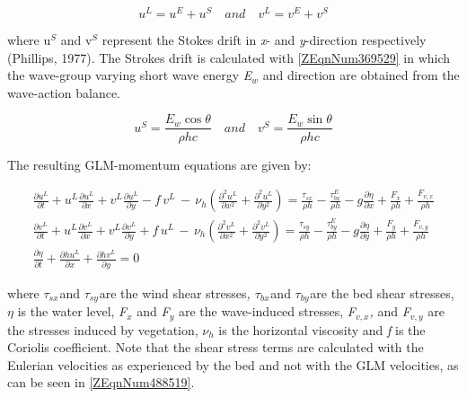 \documentclass{article}
\begin{document}
\noindent 
\begin{equation} \label{2.48)} 
u^{L} =u^{E} +u^{S} \quad and\quad v^{L} =v^{E} +v^{S}  
\end{equation} 


\noindent where u${}^{S}$ and v${}^{S}$ represent the Stokes drift in \textit{x}- and \textit{y}-direction respectively (Phillips, 1977). The Strokes drift is calculated with \eqref{ZEqnNum369529} in which the wave-group varying short wave energy \textit{E${}_{w}$} and direction are obtained from the wave-action balance.

\noindent 
\begin{equation} \label{ZEqnNum369529} 
u^{S} =\frac{E_{w} \cos \theta }{\rho hc} \quad and\quad v^{S} =\frac{E_{w} \sin \theta }{\rho hc}  
\end{equation} 


\noindent The resulting GLM-momentum equations are given by:  

\noindent 
\begin{equation} \label{ZEqnNum488519} 
\begin{array}{c} {\frac{\partial u^{L} }{\partial t} +u^{L} \frac{\partial u^{L} }{\partial x} +v^{L} \frac{\partial u^{L} }{\partial y} -f\, v^{L} \, -\, \nu _{h} \left(\frac{\partial ^{2} u^{L} }{\partial x^{2} } +\frac{\partial ^{2} u^{L} }{\partial y^{2} } \right)=\frac{\tau _{sx} }{\rho h} -\frac{\tau _{bx}^{E} }{\rho h} -g\frac{\partial \eta }{\partial x} +\frac{F_{x} }{\rho h} +\frac{F_{v,x} }{\rho h} } \\ {\frac{\partial v^{L} }{\partial t} +u^{L} \frac{\partial v^{L} }{\partial x} +v^{L} \frac{\partial v^{L} }{\partial y} +f\, u^{L} \, -\, \nu _{h} \left(\frac{\partial ^{2} v^{L} }{\partial x^{2} } +\frac{\partial ^{2} v^{L} }{\partial y^{2} } \right)=\frac{\tau _{sy} }{\rho h} -\frac{\tau _{by}^{E} }{\rho h} -g\frac{\partial \eta }{\partial y} +\frac{F_{y} }{\rho h} +\frac{F_{v,y} }{\rho h} } \\ {\frac{\partial \eta }{\partial t} +\frac{\partial hu^{L} }{\partial x} +\frac{\partial hv^{L} }{\partial y} =0} \end{array} 
\end{equation} 


\noindent where \textit{$\tau $${}_{sx}$}${}_{ }$and \textit{$\tau $${}_{sy}$}${}_{ }$are the wind shear stresses\textit{, $\tau $${}_{bx}$}${}_{ }$and \textit{$\tau $${}_{by}$}${}_{ }$are the bed shear stresses, \textit{$\eta $} is the water level, \textit{F${}_{x}$ }and \textit{F${}_{y}$} are the wave-induced stresses, \textit{F${}_{v,x}$, }and \textit{F${}_{v,y}$} are the stresses induced by vegetation, \textit{$\nu $${}_{h}$} is the horizontal viscosity and \textit{f} is the Coriolis coefficient. Note that the shear stress terms are calculated with the Eulerian velocities as experienced by the bed and not with the GLM velocities, as can be seen in \eqref{ZEqnNum488519}. 
\end{document}
